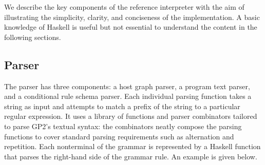\begin{comment}
\item The graph matching code is covered by three modules. The \texttt{Mapping} module contains a definition of a generic association list. These are used extensively in the matching algorithm to represent node mappings, edge mappings, and the environment. The two remaining modules, \texttt{GraphMatch} and \texttt{LabelMatch} contain the matching algorithms for graphs and labels respectively. Combined, the modules have 405 lines of code.
\item \texttt{ApplyRule} and \texttt{Evaluate} are responsible for rule application. The latter replaces variables with values and evaluates expressions that occur in RHS labels and rule schema conditions. The former modifies the host graph with respect to a rule to generate a set of graphs from a collection of matches. The total line count is 259.
\item \texttt{RunProgram} executes a GP2 program. It applies rules to the host graph and maintains data about the execution. 
\item \texttt{I/O} consists of the \texttt{Main} module, the entry point to the interpreter, which takes as input the text files and rule application bound. There are two modules to handle output: \texttt{PrintGraph} and \texttt{ViewGraph}. They print graphs in GP2's textual syntax and the graph description language DOT respectively.
\end{comment}

We describe the key components of the reference interpreter with the aim of illustrating the simplicity, clarity, and conciseness of the implementation. A basic knowledge of Haskell is useful but not essential to understand the content in the following sections.

\subsection{Parser}
The parser has three components: a host graph parser, a program text parser, and a conditional rule schema parser. Each individual parsing function takes a string as input and attempts to match a prefix of the string to a particular regular expression. It uses a library of functions and parser combinators tailored to parse GP2's textual syntax: the combinators neatly compose the parsing functions to cover standard parsing requirements such as alternation and repetition. Each nonterminal of the grammar is represented by a Haskell function that parses the right-hand side of the grammar rule. An example is given below.

